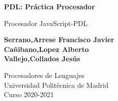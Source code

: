 \documentclass{article}
\begin{document}
\begin{titlepage}
    \begin{center}
        \vspace*{1cm}

        \Huge
        \textbf{PDL: Práctica Procesador}
        
        \vspace{0.5cm}
        \large
        Procesador JavaScript-PDL
        
        \vspace{3cm}
       
        \textbf{
            Serrano,Arrese Francisco Javier\\
            Cañibano,Lopez Alberto\\
            Vallejo,Collados Jesús
            }
            
        \vspace{8cm}
    
        \large
        Procesadores de Lenguajes\\
        Universidad Politécnica de Madrid\\
        Curso 2020-2021
        
    \end{center}
\end{titlepage}
\end{document}
